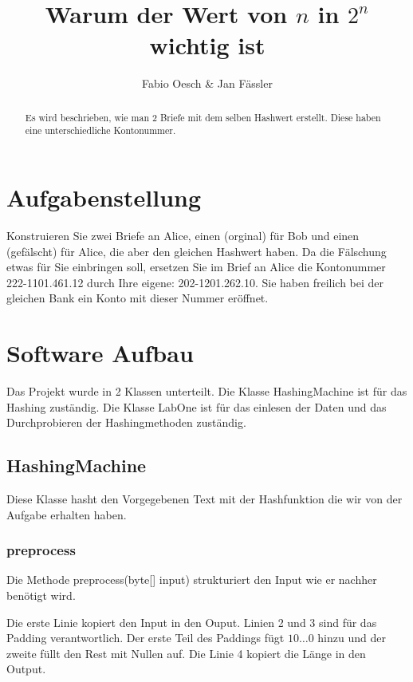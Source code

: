 \documentclass[12pt]{scrartcl}
\title{Warum der Wert von $n$ in $2^n$ wichtig ist}
\author{Fabio Oesch \& Jan Fässler}
\begin{document}
 \maketitle
 \thispagestyle{firststyle}
 \pagestyle{firststyle}
 \begin{abstract}
 \begin{center}
 Es wird beschrieben, wie man 2 Briefe mit dem selben Hashwert erstellt. Diese haben eine unterschiedliche Kontonummer.
 \end{center}
 \vspace{0.5cm}
\hrulefill
\end{abstract}

 \pagestyle{documentstyle}
 \tableofcontents
 \pagebreak
\section{Aufgabenstellung}
Konstruieren Sie zwei Briefe an Alice, einen (orginal) für Bob und einen (gefälscht) für Alice, die aber den gleichen Hashwert haben. Da die Fälschung etwas für Sie einbringen soll, ersetzen Sie im Brief an Alice die Kontonummer 222-1101.461.12 durch Ihre eigene: 202-1201.262.10. Sie haben freilich bei der gleichen Bank ein Konto mit dieser Nummer eröffnet.
\section{Software Aufbau}
Das Projekt wurde in 2 Klassen unterteilt. Die Klasse HashingMachine ist für das Hashing zuständig. Die Klasse LabOne ist für das einlesen der Daten und das Durchprobieren der Hashingmethoden zuständig.
\subsection{HashingMachine}
Diese Klasse hasht den Vorgegebenen Text mit der Hashfunktion die wir von der Aufgabe erhalten haben.
\subsubsection{preprocess}
Die Methode preprocess(byte[] input) strukturiert den Input wie er nachher benötigt wird.

Die erste Linie kopiert den Input in den Ouput. Linien 2 und 3 sind für das Padding verantwortlich. Der erste Teil des Paddings fügt $10\dots0$ hinzu und der zweite füllt den Rest mit Nullen auf. Die Linie 4 kopiert die Länge in den Output.
\end{document}
